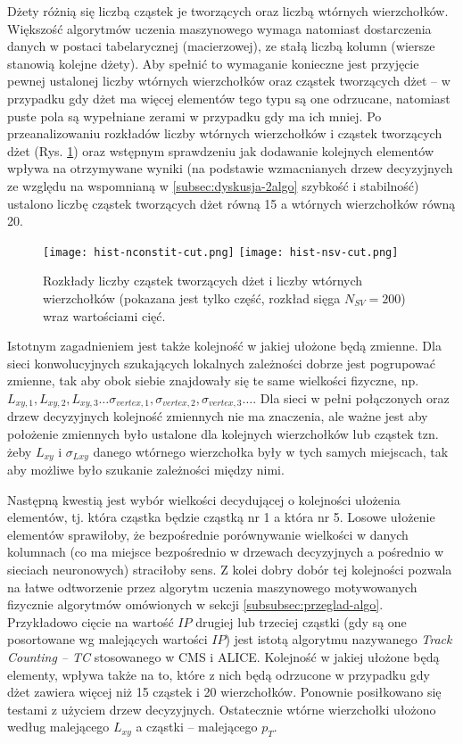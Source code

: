 Dżety różnią się liczbą cząstek je tworzących oraz liczbą wtórnych wierzchołków. Większość algorytmów uczenia maszynowego wymaga natomiast dostarczenia danych w postaci tabelarycznej (macierzowej), ze stałą liczbą kolumn (wiersze stanowią kolejne dżety). Aby spełnić to wymaganie konieczne jest przyjęcie pewnej ustalonej liczby wtórnych wierzchołków oraz cząstek tworzących dżet -- w przypadku gdy dżet ma więcej elementów tego typu są one odrzucane, natomiast puste pola są wypełniane zerami w przypadku gdy ma ich mniej. 
Po przeanalizowaniu rozkładów liczby wtórnych wierzchołków i cząstek tworzących dżet (Rys. \ref{fig:nsv_nconstit_distr}) oraz wstępnym sprawdzeniu jak dodawanie kolejnych elementów wpływa na otrzymywane wyniki (na podstawie wzmacnianych drzew decyzyjnych ze względu na wspomnianą w \ref{subsec:dyskusja-2algo} szybkość i stabilność) ustalono liczbę cząstek tworzących dżet równą 15 a wtórnych wierzchołków równą 20.

\begin{figure}[ht]
	\centering
	\texttt{[image: hist-nconstit-cut.png]}
	\texttt{[image: hist-nsv-cut.png]}
	\caption{Rozkłady liczby cząstek tworzących dżet i liczby wtórnych wierzchołków (pokazana jest tylko część, rozkład sięga $N_{SV} = 200$) wraz wartościami cięć.}
	\label{fig:nsv_nconstit_distr}
\end{figure}

Istotnym zagadnieniem jest także kolejność w jakiej ułożone będą zmienne. 
Dla sieci konwolucyjnych szukających lokalnych zależności dobrze jest pogrupować zmienne, tak aby obok siebie znajdowały się te same wielkości fizyczne, np. $L_{xy,1}, L_{xy,2}, L_{xy,3} \dots \sigma_{vertex,1}, \sigma_{vertex,2}, \sigma_{vertex,3} \dots$. 
Dla sieci w pełni połączonych oraz drzew decyzyjnych kolejność zmiennych nie ma znaczenia, ale ważne jest aby położenie zmiennych było ustalone dla kolejnych wierzchołków lub cząstek tzn. żeby $L_{xy}$ i $\sigma_{Lxy}$ danego wtórnego wierzchołka były w tych samych miejscach, tak aby możliwe było szukanie zależności między nimi.

Następną kwestią jest wybór wielkości decydującej o kolejności ułożenia elementów, tj. która cząstka będzie cząstką nr 1 a która nr 5. Losowe ułożenie elementów sprawiłoby, że bezpośrednie porównywanie wielkości w danych kolumnach (co ma miejsce bezpośrednio w drzewach decyzyjnych a pośrednio w sieciach neuronowych) straciłoby sens. Z kolei dobry dobór tej kolejności pozwala na łatwe odtworzenie przez algorytm uczenia maszynowego motywowanych fizycznie algorytmów omówionych w sekcji \ref{subsubsec:przeglad-algo}. Przykładowo cięcie na wartość $IP$ drugiej lub trzeciej cząstki (gdy są one posortowane wg malejących wartości $IP$) jest istotą algorytmu nazywanego \textit{Track Counting -- TC} stosowanego w CMS i ALICE.
Kolejność w jakiej ułożone będą elementy, wpływa także na to, które z nich będą odrzucone w przypadku gdy dżet zawiera więcej niż 15 cząstek i 20 wierzchołków. 
Ponownie posiłkowano się testami z użyciem drzew decyzyjnych. Ostatecznie wtórne wierzchołki ułożono według malejącego $L_{xy}$ a cząstki -- malejącego $p_T$.

